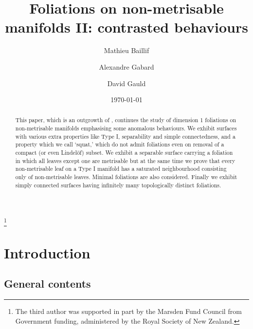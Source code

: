 \documentclass{amsart}
\begin{document}
\title{Foliations on non-metrisable manifolds II: contrasted behaviours}

\author{Mathieu Baillif}
\address{Universit\'e de Gen\`eve, Section de Math\'ematiques, Switzerland.}

\author{Alexandre Gabard}
\address{Universit\'e de Gen\`eve, Section de Math\'ematiques, Switzerland.}

\author{David Gauld}
\address{Department of Mathematics, University of Auckland, New Zealand}
\thanks{The third author was supported in part by the Marsden Fund Council from Government funding, administered by the Royal Society of New Zealand.}


\date{\today}


\begin{abstract}
This paper, which is an outgrowth of \cite{BGG}, continues the study of dimension 1 foliations on non-metrisable manifolds emphasising some anomalous behaviours. We exhibit surfaces with various extra properties like Type I, separability and simple connectedness, and a property which we call `squat,' which do not admit foliations even on removal of a compact (or even Lindel\"of) subset. We exhibit a separable surface carrying a foliation in which all leaves except one are metrisable but at the same time we prove that every non-metrisable leaf on a Type I manifold has a saturated neighbourhood consisting only of non-metrisable leaves. Minimal foliations are also considered. Finally we exhibit simply connected surfaces having infinitely many topologically distinct foliations.
\end{abstract}

\maketitle

\section{Introduction}\label{sec1}

\iffalse
\subsection{General contents}
\end{document}
